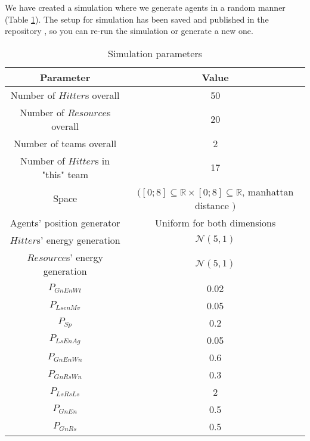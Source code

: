 We have created a simulation where we generate agents in a random manner (Table \ref{tab:sim-parameters}). The setup for
simulation has been saved and published in the repository \cite{github}, so you can re-run the simulation or generate a
new one.

\begin{table}[h!]
    \centering
    \caption{Simulation parameters}
    \label{tab:sim-parameters}

    \begin{tabular}[hbt!]{c c}
        Parameter & Value\\
        \hline
        Number of $Hitter$s overall & 50 \\
        Number of $Resource$s overall & 20 \\
        Number of teams overall & 2 \\
        Number of $Hitter$s in "this" team & 17 \\
        Space & $([0;8] \subseteq \mathbb{R} \times [0;8] \subseteq \mathbb{R}$, manhattan distance $)$ \\
        Agents' position generator & Uniform for both dimensions \\
        $Hitter$s' energy generation & $\mathcal{N} (5,1)$ \\
        $Resource$s' energy generation & $\mathcal{N} (5,1)$ \\
        $P_{GnEnWt}$ & 0.02\\
        $P_{LsenMv}$ & 0.05\\
        $P_{Sp}$     & 0.2\\
        $P_{LsEnAg}$ & 0.05\\
        $P_{GnEnWn}$ & 0.6\\
        $P_{GnRsWn}$ & 0.3\\
        $P_{LsRsLs}$ & 2\\
        $P_{GnEn}$   & 0.5\\
        $P_{GnRs}$   & 0.5\\

    \end{tabular}
\end{table}
